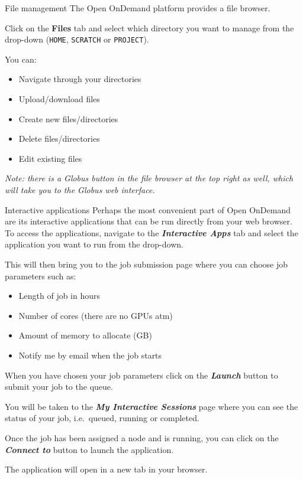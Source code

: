 \documentclass[
  10pt,
  ignorenonframetext,
  aspectratio=169,handout]{beamer}
\providecommand{\tightlist}{%
  \setlength{\itemsep}{0pt}\setlength{\parskip}{0pt}}
\begin{document}
\begin{frame}[fragile]{File management}
\label{file-management}
The Open OnDemand platform provides a file browser.

Click on the \textbf{Files} tab and select which directory you want to manage from the drop-down (\texttt{HOME}, \texttt{SCRATCH} or \texttt{PROJECT}).

\pause

You can:

\begin{itemize}
\tightlist
\item
  Navigate through your directories
\item
  Upload/download files
\item
  Create new files/directories
\item
  Delete files/directories
\item
  Edit existing files
\end{itemize}

\pause

\emph{Note: there is a Globus button in the file browser at the top right as well, which will take you to the Globus web interface.}
\end{frame}

\begin{frame}{Interactive applications}
\label{interactive-applications}
Perhaps the most convenient part of Open OnDemand are its interactive applications that can be run directly from your web browser. To access the applications, navigate to the \textbf{\emph{Interactive Apps}} tab and select the application you want to run from the drop-down.

\pause

This will then bring you to the job submission page where you can choose job parameters such as:

\pause

\begin{itemize}
\tightlist
\item
  Length of job in hours
\item
  Number of cores (there are no GPUs atm)
\item
  Amount of memory to allocate (GB)
\item
  Notify me by email when the job starts
\end{itemize}

\pause

When you have chosen your job parameters click on the \textbf{\emph{Launch}} button to submit your job to the queue.

\pause

You will be taken to the \textbf{\emph{My Interactive Sessions}} page where you can see the status of your job, i.e.~queued, running or completed.

\pause

Once the job has been assigned a node and is running, you can click on the \textbf{\emph{Connect to }} button to launch the application.

\pause

The application will open in a new tab in your browser.
\end{frame}
\end{document}
